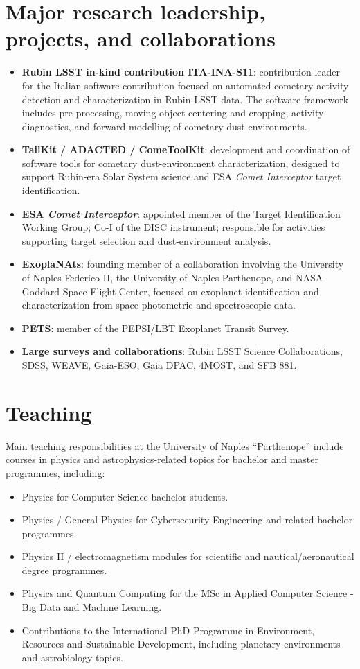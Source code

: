 \documentclass[11pt,a4paper]{article}
\begin{document}
\section*{Major research leadership, projects, and collaborations}
\begin{itemize}
    \item \textbf{Rubin LSST in-kind contribution ITA-INA-S11}: contribution leader for the Italian software contribution focused on automated cometary activity detection and characterization in Rubin LSST data. The software framework includes pre-processing, moving-object centering and cropping, activity diagnostics, and forward modelling of cometary dust environments.
    \item \textbf{TailKit / ADACTED / ComeToolKit}: development and coordination of software tools for cometary dust-environment characterization, designed to support Rubin-era Solar System science and ESA \textit{Comet Interceptor} target identification.
    \item \textbf{ESA \textit{Comet Interceptor}}: appointed member of the Target Identification Working Group; Co-I of the DISC instrument; responsible for activities supporting target selection and dust-environment analysis.
    \item \textbf{ExoplaNAts}: founding member of a collaboration involving the University of Naples Federico II, the University of Naples Parthenope, and NASA Goddard Space Flight Center, focused on exoplanet identification and characterization from space photometric and spectroscopic data.
    \item \textbf{PETS}: member of the PEPSI/LBT Exoplanet Transit Survey.
    \item \textbf{Large surveys and collaborations}: Rubin LSST Science Collaborations, SDSS, WEAVE, Gaia-ESO, Gaia DPAC, 4MOST, and SFB 881.
\end{itemize}

\section*{Teaching}
Main teaching responsibilities at the University of Naples ``Parthenope'' include courses in physics and astrophysics-related topics for bachelor and master programmes, including:
\begin{itemize}
    \item Physics for Computer Science bachelor students.
    \item Physics / General Physics for Cybersecurity Engineering and related bachelor programmes.
    \item Physics II / electromagnetism modules for scientific and nautical/aeronautical degree programmes.
    \item Physics and Quantum Computing for the MSc in Applied Computer Science - Big Data and Machine Learning.
    \item Contributions to the International PhD Programme in Environment, Resources and Sustainable Development, including planetary environments and astrobiology topics.
\end{itemize}
\end{document}
